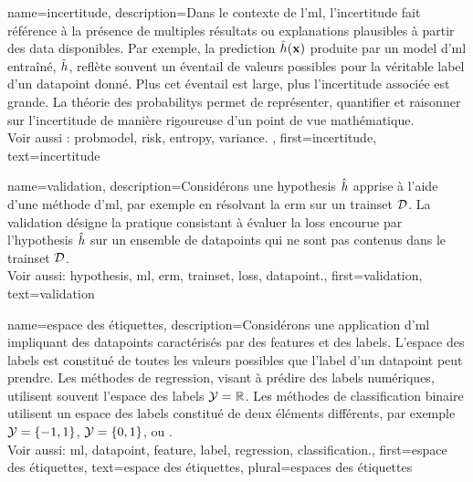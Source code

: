 {name={incertitude},
	description={Dans le contexte de l’\gls{ml}, l’incertitude fait référence à la présence de multiples 
		résultats ou \glspl{explanation} plausibles à partir des \gls{data} disponibles. Par exemple, la 
		\gls{prediction} $\hat{h}({\bf x})$ produite par un \gls{model} d’\gls{ml} entraîné, $\hat{h}$,
		reflète souvent un éventail de valeurs possibles pour la véritable \gls{label} d’un \gls{datapoint} donné. 
		Plus cet éventail est large, plus l’incertitude associée est grande. La théorie des \glspl{probability} 
		permet de représenter, quantifier et raisonner sur l’incertitude de manière 
		rigoureuse d'un point de vue mathématique.
		\\ 
		Voir aussi : \gls{probmodel}, \gls{risk}, \gls{entropy}, \gls{variance}. },
	first={incertitude},
	text={incertitude}
}

{
	name={validation},
	description={Considérons une \gls{hypothesis} $\hat{h}$ apprise à l’aide d’une méthode d'\gls{ml}, par exemple en résolvant la \gls{erm} sur un \gls{trainset} $\mathcal{D}$. La validation désigne la pratique consistant à évaluer la \gls{loss} encourue par l’\gls{hypothesis} $\hat{h}$ sur un ensemble de \glspl{datapoint} qui ne sont pas contenus dans le \gls{trainset} $\mathcal{D}$.
		\\
		Voir aussi: \gls{hypothesis}, \gls{ml}, \gls{erm}, \gls{trainset}, \gls{loss}, \gls{datapoint}.},
	first={validation}, text={validation}
}

{
	name={espace des étiquettes},
	description={Considérons une application d'\gls{ml} impliquant des \glspl{datapoint} caractérisés par des \glspl{feature} et des \glspl{label}. L’espace des \glspl{label} est constitué de toutes les valeurs possibles que l'\gls{label} d’un \gls{datapoint} peut prendre. Les méthodes de \gls{regression}, visant à prédire des \glspl{label} numériques, utilisent souvent l’espace des \glspl{label} $\mathcal{Y} = \mathbb{R}$. Les méthodes de \gls{classification} binaire utilisent un espace des \glspl{label} constitué de deux éléments différents, par exemple $\mathcal{Y} =\{-1,1\}$, $\mathcal{Y}=\{0,1\}$, ou .\\
		Voir aussi: \gls{ml}, \gls{datapoint}, \gls{feature}, \gls{label}, \gls{regression}, \gls{classification}.}, 
	first={espace des étiquettes},
	text={espace des étiquettes}, plural={espaces des étiquettes}
}

